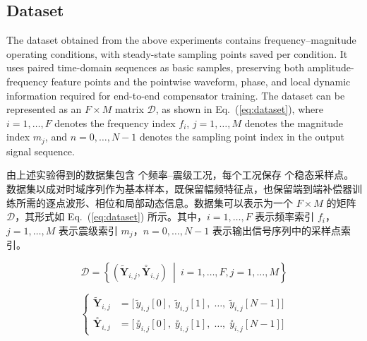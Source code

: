 \documentclass[sn-nature]{sn-jnl}
\newif\ifCNENEnglish
\newif\ifCNENBilingual
\newcommand{\CNEN}[2]{%
    \ifCNENBilingual
        #1%
        \if\relax\detokenize{#2}\relax\else\par #2\fi%
    \else
        \ifCNENEnglish
            #2%
        \else
            #1%
        \fi
    \fi
}
\newcommand{\magn}{m} %
\newcommand{\fidx}{i} %
\newcommand{\fmax}{F} %
\newcommand{\midx}{j} %
\newcommand{\mmax}{M} %
\newcommand{\pidx}{n} %
\newcommand{\pmax}{N} %
\newcommand{\dataset}{{\mathcal{D}}} %
\newcommand{\yseq}{{\mathbf{Y}}} %
\newcommand{\ideal}[1]{\overset{\circ}{#1}} %
\newcommand{\exam}[1]{\tilde{#1}} %
\begin{document}
\subsection{Dataset}
\CNEN{由上述实验得到的数据集包含 \valDatasetOperatingPoints{} 个频率--震级工况，每个工况保存 \valDatasetPointsPerRecord{} 个稳态采样点。数据集以成对时域序列作为基本样本，既保留幅频特征点，也保留端到端补偿器训练所需的逐点波形、相位和局部动态信息。数据集可以表示为一个 $\fmax \times \mmax$ 的矩阵 $\dataset$，其形式如 Eq.~(\ref{eq:dataset}) 所示。其中，$\fidx = 1,\dots,\fmax$ 表示频率索引 $f_\fidx$，$\midx = 1,\dots,\mmax$ 表示震级索引 $\magn_\midx$，$\pidx = 0,\dots,\pmax-1$ 表示输出信号序列中的采样点索引。}{The dataset obtained from the above experiments contains \valDatasetOperatingPoints{} frequency--magnitude operating conditions, with \valDatasetPointsPerRecord{} steady-state sampling points saved per condition. It uses paired time-domain sequences as basic samples, preserving both amplitude-frequency feature points and the pointwise waveform, phase, and local dynamic information required for end-to-end compensator training. The dataset can be represented as an $\fmax \times \mmax$ matrix $\dataset$, as shown in Eq.~(\ref{eq:dataset}), where $\fidx = 1,\dots,\fmax$ denotes the frequency index $f_\fidx$, $\midx = 1,\dots,\mmax$ denotes the magnitude index $\magn_\midx$, and $\pidx = 0,\dots,\pmax-1$ denotes the sampling point index in the output signal sequence.%
}
\begin{equation}
    \dataset = \left\{ \left(\exam{\yseq}_{\fidx,\midx}, \ideal{\yseq}_{\fidx,\midx} \right) \ \middle| \ \fidx = 1, \dots, \fmax, \midx = 1, \dots, \mmax \right\}
    \label{eq:dataset}
\end{equation}

\begin{equation}
    \left\{
    \begin{aligned}
        \exam{\yseq}_{\fidx,\midx}  & =
        \bigl[
            \,\exam{y}_{\fidx,\midx}[0],\;
            \exam{y}_{\fidx,\midx}[1],\;
            \ldots,\;
            \exam{y}_{\fidx,\midx}[\pmax-1]
        \bigr]                          \\
        \ideal{\yseq}_{\fidx,\midx} & =
        \bigl[
            \,\ideal{y}_{\fidx,\midx}[0],\;
            \ideal{y}_{\fidx,\midx}[1],\;
            \ldots,\;
            \ideal{y}_{\fidx,\midx}[\pmax-1]
            \bigr]
    \end{aligned}
    \right.
    \label{eq:dataset_element}
\end{equation}
\end{document}
